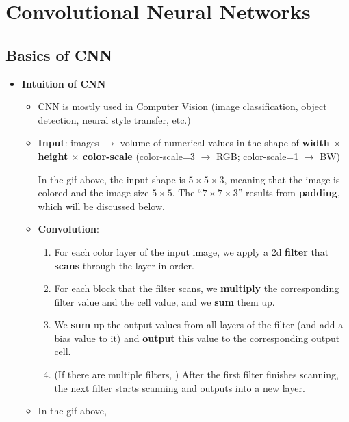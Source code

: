 \documentclass[
]{book}
\providecommand{\tightlist}{%
  \setlength{\itemsep}{0pt}\setlength{\parskip}{0pt}}
\begin{document}
\hypertarget{cnn}{%
\chapter{Convolutional Neural Networks}\label{cnn}}

\hypertarget{basics-of-cnn}{%
\section{Basics of CNN}\label{basics-of-cnn}}

\begin{itemize}
\item
  \textbf{Intuition of CNN}

  \begin{itemize}
  \item
    CNN is mostly used in Computer Vision (image classification, object
    detection, neural style transfer, etc.)
  \item
    \textbf{Input}: images \(\rightarrow\) volume of numerical values in
    the shape of \textbf{width \(\times\) height \(\times\) color-scale}
    (color-scale=3 \(\rightarrow\) RGB; color-scale=1 \(\rightarrow\)
    BW)

    In the gif above, the input shape is \(5\times5\times3\), meaning
    that the image is colored and the image size \(5\times5\). The
    ``\(7\times7\times3\)'' results from \textbf{padding}, which will be
    discussed below.
  \item
    \textbf{Convolution}:

    \begin{enumerate}
    \def\labelenumi{\arabic{enumi}.}
    \tightlist
    \item
      For each color layer of the input image, we apply a 2d
      \textbf{filter} that \textbf{scans} through the layer in order.
    \item
      For each block that the filter scans, we \textbf{multiply} the
      corresponding filter value and the cell value, and we \textbf{sum}
      them up.
    \item
      We \textbf{sum} up the output values from all layers of the filter
      (and add a bias value to it) and \textbf{output} this value to the
      corresponding output cell.
    \item
      (If there are multiple filters, ) After the first filter finishes
      scanning, the next filter starts scanning and outputs into a new
      layer.\\
    \end{enumerate}
  \item
    In the gif above,


\end{itemize}
\end{itemize}
\end{document}
